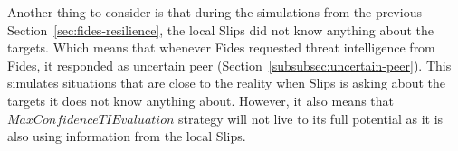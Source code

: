 Another thing to consider is that during the simulations from the previous Section~\ref{sec:fides-resilience}, the local Slips did not know anything about the targets. Which means that whenever Fides requested threat intelligence from Fides, it responded as uncertain peer (Section~\ref{subsubsec:uncertain-peer}). This simulates situations that are close to the reality when Slips is asking about the targets it does not know anything about.
However, it also means that $MaxConfidenceTIEvaluation$ strategy will not live to its full potential as it is also using information from the local Slips. 